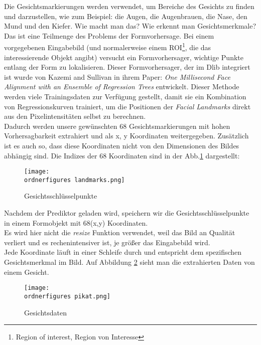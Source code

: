 Die Gesichtsmarkierungen werden verwendet, um Bereiche des Gesichts zu finden
und darzustellen, wie zum Beispiel: die Augen, die Augenbrauen, die Nase, den
Mund und den Kiefer. Wie macht man das? Wie erkennt man Gesichtsmerkmale? \\Das ist eine Teilmenge des Problems der Formvorhersage. Bei einem vorgegebenen Eingabebild (und
normalerweise einem ROI\footnote{Region of interest, Region von Interesse}, die
das interessierende Objekt angibt) versucht ein Formvorhersager, wichtige Punkte
entlang der Form zu lokalisieren. 
Dieser Formvorhersager, der im Dlib integriert ist wurde von Kazemi and Sullivan
in ihrem Paper: \textit{One Millisecond Face Alignment with an Ensemble of
	Regression Trees} entwickelt.\cite{Kazemi2014OneMF} 
Dieser Methode werden viele Trainingsdaten zur Verfügung gestellt, damit sie ein Kombination von Regressionskurven trainiert, um die Positionen der \textit{Facial Landmarks} direkt aus den Pixelintensitäten selbst zu berechnen.\cite{Kazemi2014OneMF} \\

Dadurch werden unsere gewünschten 68 Gesichtsmarkierungen mit hohen
Vorhersagbarkeit extrahiert und als x, y Koordinaten weitergegeben. 
Zusätzlich ist es auch so, dass diese Koordinaten nicht von den
Dimensionen des Bildes abhängig sind. 
Die Indizes der 68 Koordinaten sind in der Abb.\ref{fig:landmarks} dargestellt:
\\

\begin{figure}[H]
	\texttt{[image: \\ordnerfigures landmarks.png]}
	\centering
	\caption{Gesichtsschlüsselpunkte \cite{Kazemi2014OneMF}}
	\label{fig:landmarks}
\end{figure}

Nachdem der Prediktor geladen wird, speichern wir die Gesichtsschlüsselpunkte in einem Formobjekt
mit 68(x,y) Koordinaten. \\
Es wird hier nicht die \textit{resize} Funktion verwendet, weil das Bild an Qualität verliert
und es rechenintensiver ist, je größer das Eingabebild wird. \\
Jede Koordinate läuft in einer Schleife durch und entspricht dem spezifischen
Gesichtsmerkmal im Bild. Auf Abbildung \ref{fig:data} sieht man die extrahierten Daten von einem Gesicht. \\
\begin{figure}[H]
	\texttt{[image: \\ordnerfigures pikat.png]}
	\centering
	\caption{Gesichtsdaten}
	\label{fig:data}
\end{figure}


